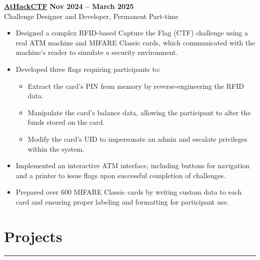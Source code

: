 \documentclass[10pt]{article}
\begin{document}
{\href{https://www.athackctf.com}{\textbf{AtHackCTF}}} \hfill \textbf{Nov 2024 -- March 2025} \\
{Challenge Designer and Developer, Permanent Part-time}
\vspace{-3mm}
\begin{itemize}[left=0.15in, itemsep=0pt]
    \item Designed a complex RFID-based Capture the Flag (CTF) challenge using a real ATM machine and MIFARE Classic cards, which communicated with the machine's reader to simulate a security environment.
    \item Developed three flags requiring participants to:
    
        \begin{itemize}[left=0.15in, itemsep=0pt]
            \vspace{-2mm}
            \item Extract the card’s PIN from memory by reverse-engineering the RFID data.
            \item Manipulate the card's balance data, allowing the participant to alter the funds stored on the card.
            \item Modify the card's UID to impersonate an admin and escalate privileges within the system.
        \end{itemize}
        \vspace{-2mm}
    
    \item Implemented an interactive ATM interface, including buttons for navigation and a printer to issue flags upon successful completion of challenges.
    \item Prepared over 600 MIFARE Classic cards by writing custom data to each card and ensuring proper labeling and formatting for participant use.
\end{itemize}

\vspace{-6mm} %
\section*{Projects}
\vspace{-2mm}
\hrule
\vspace{0mm}
\end{document}
